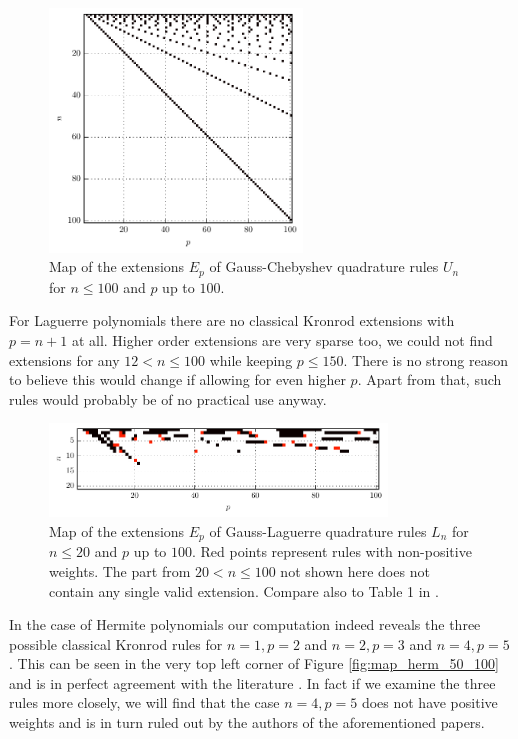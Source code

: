\documentclass[a4paper,10pt]{article}
\begin{document}
\begin{figure}
  \centering
  \includegraphics[width=0.6\textwidth]{./img/map_chebu_100_100.pdf}
  \caption{Map of the extensions $E_p$ of Gauss-Chebyshev quadrature rules
           $U_n$ for $n \leq 100$ and $p$ up to $100$.}
  \label{fig:map_chebu_100_100}
\end{figure}

For Laguerre polynomials there are no classical Kronrod extensions with $p = n+1$
at all. Higher order extensions are very sparse too, we could not find extensions
for any $12 < n \leq 100$ while keeping $p \leq 150$. There is no strong reason to
believe this would change if allowing for even higher $p$. Apart from that, such
rules would probably be of no practical use anyway.

\begin{figure}
  \centering
  \includegraphics[width=0.8\textwidth]{./img/map_lag_20_100.pdf}
  \caption{Map of the extensions $E_p$ of Gauss-Laguerre quadrature rules
           $L_n$ for $n \leq 20$ and $p$ up to $100$. Red points represent
           rules with non-positive weights. The part from $20 < n \leq 100$
           not shown here does not contain any single valid extension.
           Compare also to Table 1 in \cite{kahaner_waldvogel_fullerton}.}
  \label{fig:map_lag_20_100}
\end{figure}

In the case of Hermite polynomials our computation indeed reveals the three possible
classical Kronrod rules for $n=1, p=2$ and $n = 2, p = 3$ and $n = 4, p = 5$. This
can be seen in the very top left corner of Figure \ref{fig:map_herm_50_100} and is
in perfect agreement with the literature \cite{monegato1976, kahaner-monegato, vladislav}.
In fact if we examine the three rules more closely, we will find that the case
$n = 4, p = 5$ does not have positive weights and is in turn ruled out by the
authors of the aforementioned papers.
\end{document}
